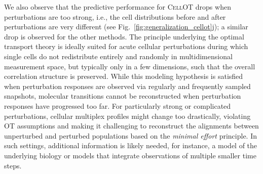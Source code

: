 \smallskip

We also observe that the predictive performance for \textsc{CellOT} drops when perturbations are too strong, i.e., the cell distributions before and after perturbations are very different (see Fig.~\ref{fig:generalization_cellot}j); a similar drop is observed for the other methods.
The principle underlying the optimal transport theory is ideally suited for acute cellular perturbations during which single cells do not redistribute entirely and randomly in multidimensional measurement space, but typically only in a few dimensions, such that the overall correlation structure is preserved. While this modeling hypothesis is satisfied when perturbation responses are observed via regularly and frequently sampled snapshots, molecular transitions cannot be reconstructed when perturbation responses have progressed too far. For particularly strong or complicated perturbations, cellular multiplex profiles might change too drastically, violating OT assumptions and making it challenging to reconstruct the alignments between unperturbed and perturbed populations based on the \emph{minimal effort} principle.
In such settings, additional information is likely needed, for instance, a model of the underlying biology or models that integrate observations of multiple smaller time steps. 

